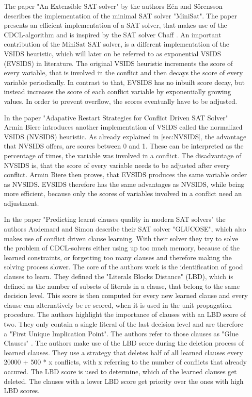 The paper "An Extensible SAT-solver" \cite{een2003extensible} by the authors E{\'e}n and Sörensson describes the implementation of the minimal SAT solver "MiniSat". The paper presents an efficient implementation of a SAT solver, that makes use of the CDCL-algorithm and is inspired by the SAT solver Chaff \cite{moskewicz2001chaff}. An important contribution of the MiniSat SAT solver, is a different implementation of the VSIDS heuristic, which will later on be referred to as exponential VSIDS (EVSIDS) in literature. The original VSIDS heuristic increments the score of every variable, that is involved in the conflict and then decays the score of every variable periodically. In contrast to that, EVSIDS has no inbuilt score decay, but instead increases the score of each conflict variable by exponentially growing values. In order to prevent overflow, the scores eventually have to be adjusted.

In the paper "Adapative Restart Strategies for Conflict Driven SAT Solver" \cite{biere2008adaptive} Armin Biere introduces another implementation of VSIDS called the normalized VSIDS (NVSIDS) heuristic. As already explained in \ref{sec:NVSIDS}, the advantage that NVSIDS offers, are scores between 0 and 1. These can be interpreted as the percentage of times, the variable was involved in a conflict. The disadvantage of NVSIDS is, that the score of every variable needs to be adjusted after every conflict. Armin Biere then proves, that EVSIDS produces the same variable order as NVSIDS. EVSIDS therefore has the same advantages as NVSIDS, while being more efficient, because only the scores of variables involved in a conflict need an adjustment.

In the paper "Predicting learnt clauses quality in modern SAT solvers" \cite{audemard2009predicting} the authors Audemard and Simon describe their SAT solver "GLUCOSE", which also makes use of conflict driven clause learning. With their solver they try to solve the problem of CDCL-solvers either using up too much memory, because of the learned constraints, or forgetting too many clauses and therefore making the solving process slower. The core of the authors work is the identification of good clauses to learn. They defined the "Literals Blocks Distance" (LBD), which is defined as the number of subsets of literals in a clause, that belong to the same decision level. This score is then computed for every new learned clause and every clause can alternatively be re-scored, when it is used in the unit propagation procedure. The authors highlight the importance of clauses with an LBD score of two. They only contain a single literal of the last decision level and are therefore a "First Unique Implication Point". The authors refer to those clauses as "Glue Clauses" \cite{audemard2009predicting}. The authors make use of the LBD score during the deletion process of learned clauses. They use a strategy that deletes half of all learned clauses every 20000 + 500 * x conflicts, with x referring to the number of conflicts that already occured. The LBD score is used to determine, which of the learned clauses get deleted. The clauses with a lower LBD score get priority over the ones with high LBD scores.

